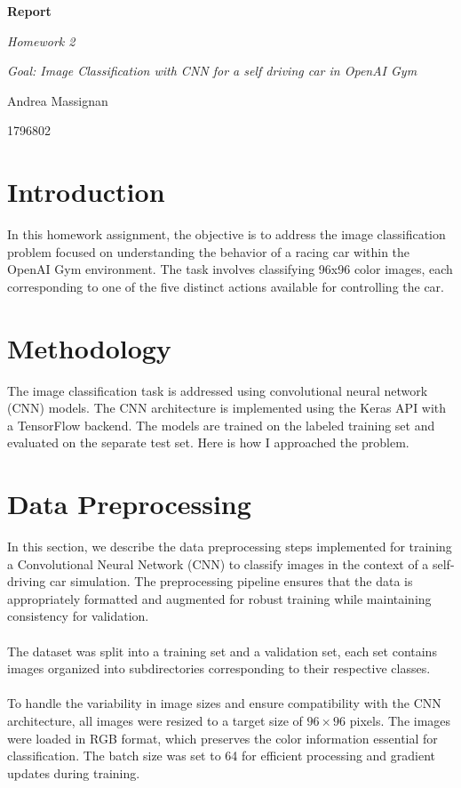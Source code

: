 \documentclass{article}
\begin{document}
\begin{titlepage}
    \centering
    \vspace*{2cm}
    {\Huge\bfseries Report\par}
    \vspace{2cm}
    {\Large\itshape Homework 2\par}
    \vspace{0.5cm}
    {\large\itshape Goal: Image Classification with CNN for a self driving car in OpenAI Gym\par}
    \vfill
    {\Large Andrea Massignan\par}
    {\Large 1796802\par}
    \vfill
\end{titlepage}

\section{Introduction}

In this homework assignment, the objective is to address the image classification problem focused on understanding the behavior of a racing car within the OpenAI Gym environment. The task involves classifying 96x96 color images, each corresponding to one of the five distinct actions available for controlling the car.

\section{Methodology}

The image classification task is addressed using convolutional neural network (CNN) models. The CNN architecture is implemented using the Keras API with a TensorFlow backend. The models are trained on the labeled training set and evaluated on the separate test set.
\newline
\newline
Here is how I approached the problem.

\section{Data Preprocessing}

In this section, we describe the data preprocessing steps implemented for training a Convolutional Neural Network (CNN) to classify images in the context of a self-driving car simulation. The preprocessing pipeline ensures that the data is appropriately formatted and augmented for robust training while maintaining consistency for validation.
\\\\
The dataset was split into a training set and a validation set, each set contains images organized into subdirectories corresponding to their respective classes.
\\\\
To handle the variability in image sizes and ensure compatibility with the CNN architecture, all images were resized to a target size of \(96 \times 96\) pixels. The images were loaded in RGB format, which preserves the color information essential for classification. The batch size was set to 64 for efficient processing and gradient updates during training.
\end{document}
